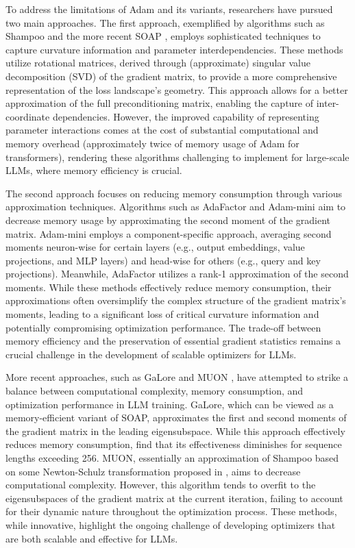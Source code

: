 To address the limitations of Adam and its variants, researchers have pursued two main approaches. The first approach, exemplified by algorithms such as Shampoo \citep{gupta2018shampoo} and the more recent SOAP \citep{vyas2024soap}, employs sophisticated techniques to capture curvature information and parameter interdependencies. These methods utilize rotational matrices, derived through (approximate) singular value decomposition (SVD) of the gradient matrix, to provide a more comprehensive representation of the loss landscape's geometry. This approach allows for a better approximation of the full preconditioning matrix, enabling the capture of inter-coordinate dependencies. However, the improved capability of representing parameter interactions comes at the cost of substantial computational and memory overhead (approximately twice of memory usage of Adam for transformers), rendering these algorithms challenging to implement for large-scale LLMs, where memory efficiency is crucial.

The second approach focuses on reducing memory consumption through various approximation techniques. Algorithms such as AdaFactor \citep{shazeer2018adafactor} and Adam-mini \citep{zhang2024adam} aim to decrease memory usage by approximating the second moment of the gradient matrix. Adam-mini employs a component-specific approach, averaging second moments neuron-wise for certain layers (e.g., output embeddings, value projections, and MLP layers) and head-wise for others (e.g., query and key projections). Meanwhile, AdaFactor utilizes a rank-1 approximation of the second moments. While these methods effectively reduce memory consumption, their approximations often oversimplify the complex structure of the gradient matrix's moments, leading to a significant loss of critical curvature information and potentially compromising optimization performance. The trade-off between memory efficiency and the preservation of essential gradient statistics remains a crucial challenge in the development of scalable optimizers for LLMs.

More recent approaches, such as GaLore \citep{zhao2024galore} and MUON \citep{jordan2024MUON}, have attempted to strike a balance between computational complexity, memory consumption, and optimization performance in LLM training. GaLore, which can be viewed as a memory-efficient variant of SOAP, approximates the first and second moments of the gradient matrix in the leading eigensubspace. While this approach effectively reduces memory consumption, \citet{liang2024memory} find that its effectiveness diminishes for sequence lengths exceeding 256. MUON, essentially an approximation of Shampoo based on some Newton-Schulz transformation proposed in \citet{bernstein2024modular}, aims to decrease computational complexity. However, this algorithm tends to overfit to the eigensubspaces of the gradient matrix at the current iteration, failing to account for their dynamic nature throughout the optimization process. These methods, while innovative, highlight the ongoing challenge of developing optimizers that are both scalable and effective for LLMs. 

